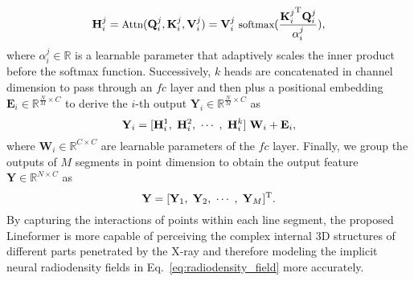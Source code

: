 \documentclass[10pt,twocolumn,letterpaper]{article}
\begin{document}
\begin{equation}
\small
\mathbf{H}_i^j = \text{Attn}(\mathbf{Q}_i^j, \mathbf{K}_i^j, \mathbf{V}_i^j) = \mathbf{V}_i^j ~\text{softmax}(\frac{{\mathbf{K}_i^j}^{\text{T}}\mathbf{Q}_i^j}{\alpha_i^j}),
\label{eq:ls_msa}
\vspace{-0.8mm}
\end{equation}
where $\alpha_i^j \in \mathbb{R}$ is a learnable parameter that adaptively scales the inner product before the softmax function. Successively, $k$ heads are concatenated in channel dimension to pass through an $fc$ layer and then plus a positional embedding $\mathbf{E}_i \in \mathbb{R}^{\frac{N}{M} \times C}$ to derive the $i$-th output $\mathbf{Y}_i \in \mathbb{R}^{\frac{N}{M} \times C}$ as
\vspace{-1.5mm}
\begin{equation}
\small
\mathbf{Y}_i = [\mathbf{H}_i^1,~\mathbf{H}_i^2,~\cdots~,~\mathbf{H}_i^k]~\mathbf{W}_i + \mathbf{E}_i,
\vspace{1.5mm}
\end{equation}
where $\mathbf{W}_i \in \mathbb{R}^{C \times C}$ are learnable parameters of the $fc$ layer. Finally, we group the outputs of $M$ segments in point dimension to obtain the output feature $\mathbf{Y} \in \mathbb{R}^{{N} \times C}$ as
\vspace{-0.4mm}
\begin{equation}
\small
\mathbf{Y} = [\mathbf{Y}_1,~\mathbf{Y}_2,~\cdots~,~ \mathbf{Y}_M]^{\text{T}}.
\vspace{-0.4mm}
\end{equation}
By capturing the interactions of points within each line segment, the proposed Lineformer is more capable of perceiving the complex internal 3D structures of different parts penetrated by the X-ray and therefore modeling the implicit neural radiodensity fields in Eq.~\eqref{eq:radiodensity_field} more accurately.
\end{document}
